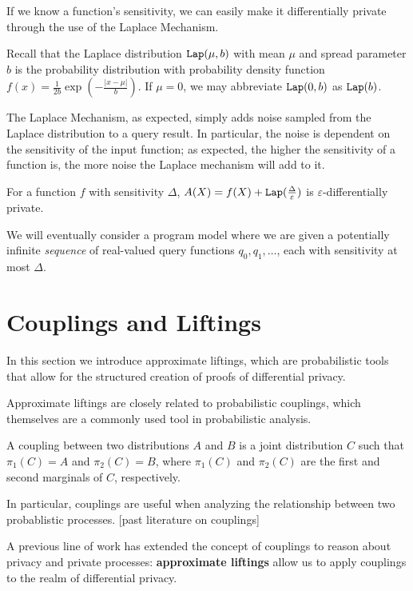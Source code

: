 If we know a function's sensitivity, we can easily make it differentially private through the use of the Laplace Mechanism.


Recall that the Laplace distribution $\texttt{Lap}(\mu, b)$ with mean $\mu$ and spread parameter $b$ is the probability distribution with probability density function $f(x) = \frac{1}{2b}\exp(-\frac{|x-\mu|}{b})$. If $\mu =0$, we may abbreviate $\texttt{Lap}(0, b)$ as $\texttt{Lap}(b)$. 

The Laplace Mechanism, as expected, simply adds noise sampled from the Laplace distribution to a query result. In particular, the noise is dependent on the sensitivity of the input function; as expected, the higher the sensitivity of a function is, the more noise the Laplace mechanism will add to it.   

\begin{thm}
    For a function $f$ with sensitivity $\Delta$, $A(X) = f(X) + \texttt{Lap}(\frac{\Delta}{\varepsilon})$ is $\varepsilon$-differentially private. 
\end{thm}

We will eventually consider a program model where we are given a potentially infinite \textit{sequence} of real-valued query functions $q_0, q_1, \ldots$, each with sensitivity at most $\Delta$.

\section{Couplings and Liftings}

In this section we introduce approximate liftings, which are probabilistic tools that allow for the structured creation of proofs of differential privacy.

Approximate liftings are closely related to probabilistic couplings, which themselves are a commonly used tool in probabilistic analysis.

\begin{defn}[Couplings]
    A coupling between two distributions $A$ and $B$ is a joint distribution $C$ such that $\pi_1(C)=A$ and $\pi_2(C)=B$, where $\pi_1(C)$ and $\pi_2(C)$ are the first and second marginals of $C$, respectively. 
\end{defn}

In particular, couplings are useful when analyzing the relationship between two probablistic processes. [past literature on couplings]

A previous line of work has extended the concept of couplings to reason about privacy and private processes: \textbf{approximate liftings} \cite{BartheOlmedo2013,bartheKopfOlmedo2012ProbabilisticRelationalReasoningforDifferentialPriv,HsuThesis2017,BartheEtAl2016} allow us to apply couplings to the realm of differential privacy. 

